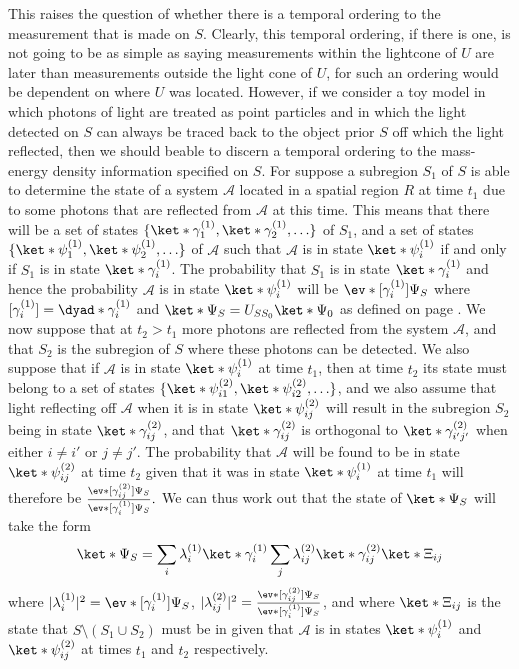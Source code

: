 This raises the question of whether there is a temporal ordering to the measurement that is made on $S$. Clearly, this temporal ordering, if there is one, is not going to be as simple as saying measurements within the lightcone of $U$ are later than measurements outside the light cone of $U$, for such an ordering would be dependent on where $U$ was located. However, if we consider a toy model in which photons of light are treated as point particles and in which the light detected on $S$ can always be traced back to the object prior $S$ off which the light reflected, then we should beable to discern a temporal ordering to the mass-energy density information specified on $S$. For suppose a subregion $S_1$ of $S$ is able to determine the state of a system $\mathcal{A}$ located in a spatial region $R$ at time $t_1$ due to some photons that are reflected from $\mathcal{A}$ at this time. This means that there will be a set of states $\{\ket*{\gamma^{(1)}_1}, \ket*{\gamma^{(1)}_2}, \ldots\}$ of $S_1$, and a set of states $\{\ket*{\psi^{(1)}_1}, \ket*{\psi^{(1)}_2}, \ldots\}$ of $\mathcal{A}$ such that $\mathcal{A}$ is in state $\ket*{\psi^{(1)}_i}$ if and only if $S_1$ is in state $\ket*{\gamma^{(1)}_i}$. The probability that $S_1$ is in state $\ket*{\gamma^{(1)}_i}$ and hence the probability $\mathcal{A}$ is in state $\ket*{\psi^{(1)}_i}$ will be $\ev*{[\gamma^{(1)}_i]}{\Psi_S}$ where $[\gamma^{(1)}_i]=\dyad*{\gamma^{(1)}_i}$ and $\ket*{\Psi_S}=U_{SS_0}\ket*{\Psi_0}$ as defined on page \pageref{SchwingerUnitaryOP}. We now suppose that at $t_2>t_1$ more photons are reflected from the system $\mathcal{A}$, and that $S_2$ is the subregion of $S$ where these photons can be detected. We also suppose that if $\mathcal{A}$ is in state $\ket*{\psi^{(1)}_i}$ at time $t_1$, then at time $t_2$ its state must belong to a set of states $\{\ket*{\psi^{(2)}_{i1}}, \ket*{\psi^{(2)}_{i2}},\ldots\}$, and we also assume that light reflecting off $\mathcal{A}$ when it is in state $\ket*{\psi^{(2)}_{ij}}$ will result in the subregion $S_2$ being in state $\ket*{\gamma^{(2)}_{ij}}$, and that $\ket*{\gamma^{(2)}_{ij}}$ is orthogonal to $\ket*{\gamma^{(2)}_{i'j'}}$ when either $i\neq i'$ or $j\neq j'$. The probability that $\mathcal{A}$ will be found to be in state   $\ket*{\psi^{(2)}_{ij}}$ at time $t_2$ given that it was in state $\ket*{\psi^{(1)}_{i}}$ at time $t_1$ will therefore be $\frac{\ev*{[\gamma^{(2)}_{ij}]}{\Psi_S}}{\ev*{[\gamma^{(1)}_{i}]}{\Psi_S}}.$ We can thus work out that the state of $\ket*{\Psi_S}$ will take the form
\begin{equation}\label{PsiStimeordering}
\ket*{\Psi_S}=\sum_{i}\lambda^{(1)}_i\ket*{\gamma^{(1)}_i}\sum_{j}\lambda^{(2)}_{ij}\ket*{\gamma^{(2)}_{ij}}\ket*{\Xi_{ij}}
\end{equation}
where $|\lambda^{(1)}_i|^2= \ev*{[\gamma^{(1)}_i]}{\Psi_S}$,  $|\lambda^{(2)}_{ij}|^2= \frac{\ev*{[\gamma^{(2)}_{ij}]}{\Psi_S}}{\ev*{[\gamma^{(1)}_{i}]}{\Psi_S}}$, and where $\ket*{\Xi_{ij}}$ is the state that $S\setminus(S_1\cup S_2)$ must be in given that $\mathcal{A}$ is in states  $\ket*{\psi^{(1)}_{i}}$ and $\ket*{\psi^{(2)}_{ij}}$ at times $t_1$ and $t_2$ respectively. 

